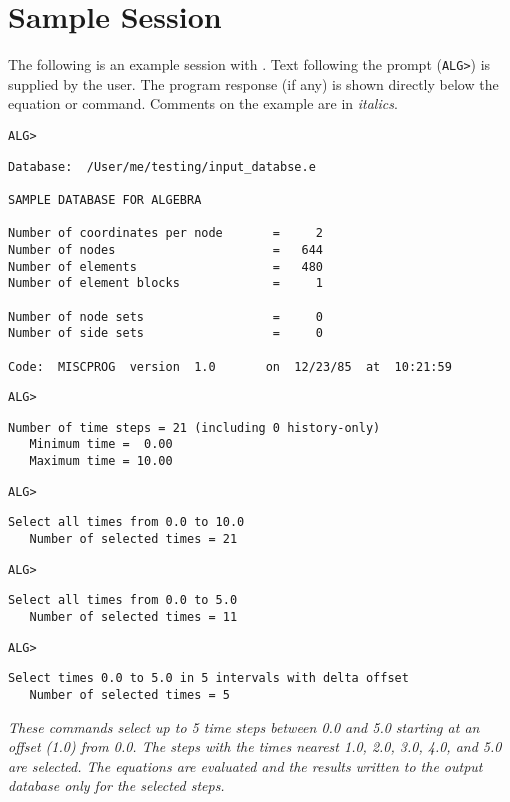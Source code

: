 \chapter{Sample Session} \label{appx:example}

The following is an example session with \caps{\PROGRAM}. Text following
the \caps{\PROGRAM} prompt (\verb|ALG>|) is supplied by the user. The
program response (if any) is shown directly below the equation or
command. Comments on the example are in {\em italics}.

\newenvironment{comments} {\em}{}

\verb|ALG>| 
\begin{verbatim}
Database:  /User/me/testing/input_databse.e

SAMPLE DATABASE FOR ALGEBRA

Number of coordinates per node       =     2
Number of nodes                      =   644
Number of elements                   =   480
Number of element blocks             =     1

Number of node sets                  =     0
Number of side sets                  =     0

Code:  MISCPROG  version  1.0       on  12/23/85  at  10:21:59
\end{verbatim}

\verb|ALG>| 
\begin{verbatim}
Number of time steps = 21 (including 0 history-only)
   Minimum time =  0.00
   Maximum time = 10.00
\end{verbatim}

\newpage
\verb|ALG>| 
\vspace{-\medskipamount} 
\begin{verbatim}
Select all times from 0.0 to 10.0
   Number of selected times = 21
\end{verbatim}
\verb|ALG>| 
\vspace{-\medskipamount} 
\begin{verbatim}
Select all times from 0.0 to 5.0
   Number of selected times = 11
\end{verbatim}
\verb|ALG>| 
\vspace{-\medskipamount} 
\begin{verbatim}
Select times 0.0 to 5.0 in 5 intervals with delta offset
   Number of selected times = 5
\end{verbatim}

\begin{comments}
These commands select up to 5 time steps between 0.0 and 5.0 starting at
an offset (1.0) from 0.0. The steps with the times nearest 1.0, 2.0,
3.0, 4.0, and 5.0 are selected. The equations are evaluated and the
results written to the output database only for the selected steps.
\end{comments}

